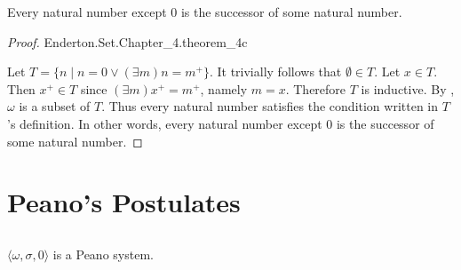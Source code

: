 \documentclass{report}
\begin{document}
\begin{theorem}[4C]

  Every natural number except $0$ is the successor of some natural number.

\end{theorem}

\begin{proof}

    {Enderton.Set.Chapter\_4.theorem\_4c}

  Let $T = \{n \mid n = 0 \lor (\exists m) n = m^+\}$.
  It trivially follows that $\emptyset \in T$.
  Let $x \in T$.
  Then $x^+ \in T$ since $(\exists m) x^+ = m^+$, namely $m = x$.
  Therefore $T$ is inductive.
  By , $\omega$ is a subset of $T$.
  Thus every natural number satisfies the condition written in $T$'s definition.
  In other words, every natural number except $0$ is the successor of some
    natural number.

\end{proof}

\section{Peano's Postulates}%

\subsection{}%

\begin{theorem}[4D]

  $\langle \omega, \sigma, 0 \rangle$ is a Peano system.

\end{theorem}
\end{document}
